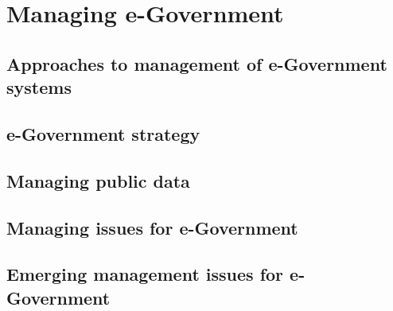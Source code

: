 \chapter{Managing e-Government}

 \section{Approaches to management of e-Government systems}
 \section{e-Government strategy}
 \section{Managing public data}
 \section{Managing issues for e-Government}
 \section{Emerging management issues for e-Government}